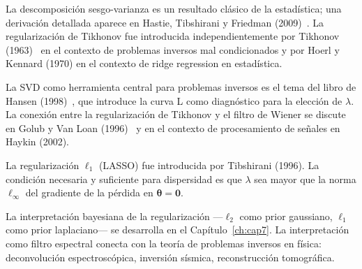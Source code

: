 \begin{notasbib}
La descomposición sesgo-varianza es un resultado clásico de la
estadística; una derivación detallada aparece en Hastie, Tibshirani y
Friedman (2009)~\cite{hastie2009elements}. La regularización de
Tikhonov fue introducida independientemente por Tikhonov
(1963)~\cite{tikhonov1963solution} en el contexto de problemas inversos
mal condicionados y por Hoerl y Kennard (1970) en el contexto de ridge
regression en estadística.

La SVD como herramienta central para problemas inversos es el tema del
libro de Hansen (1998)~\cite{hansen1998rank}, que introduce la curva L
como diagnóstico para la elección de $\lambda$. La conexión entre la
regularización de Tikhonov y el filtro de Wiener se discute en
Golub y Van Loan (1996)~\cite{golub1996matrix} y en el contexto de
procesamiento de señales en Haykin (2002).

La regularización $\ell_1$ (LASSO) fue introducida por Tibshirani
(1996). La condición necesaria y suficiente para dispersidad es que
$\lambda$ sea mayor que la norma $\ell_\infty$ del gradiente de la
pérdida en $\bm{\theta} = \bm{0}$.

La interpretación bayesiana de la regularización —$\ell_2$ como prior
gaussiano, $\ell_1$ como prior laplaciano— se desarrolla en el
Capítulo~\ref{ch:cap7}. La interpretación como filtro espectral conecta
con la teoría de problemas inversos en física: deconvolución
espectroscópica, inversión sísmica, reconstrucción tomográfica.
\end{notasbib}


